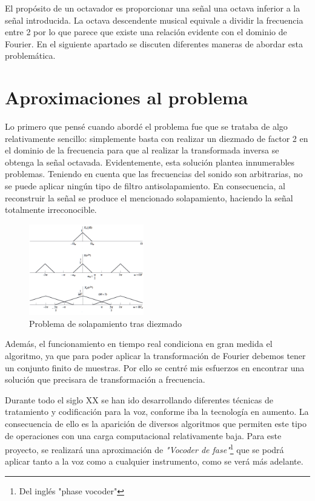 El propósito de un octavador es proporcionar una señal una octava inferior a la señal introducida. La octava descendente musical equivale a dividir la frecuencia entre 2 por lo que parece que existe una relación evidente con el dominio de Fourier. En el siguiente apartado se discuten diferentes maneras de abordar esta problemática.

\section{Aproximaciones al problema}
Lo primero que pensé cuando abordé el problema fue que se trataba de algo relativamente sencillo: simplemente basta con realizar un diezmado de factor 2 en el dominio de la frecuencia para que al realizar la transformada inversa se obtenga la señal octavada.
Evidentemente, esta solución plantea innumerables problemas. Teniendo en cuenta que las frecuencias del sonido son arbitrarias, no se puede aplicar ningún tipo de filtro antisolapamiento. En consecuencia, al reconstruir la señal se produce el mencionado solapamiento, haciendo la señal totalmente irreconocible.
\begin{figure}
\begin{center}
\includegraphics[width=5cm]{img/solapamiento.png}
\caption{Problema de solapamiento tras diezmado}
\end{center}
\end{figure}
Además, el funcionamiento en tiempo real condiciona en gran medida el algoritmo, ya que para poder aplicar la transformación de Fourier debemos tener un conjunto finito de muestras. Por ello se centré mis esfuerzos en encontrar una solución que precisara de transformación a frecuencia.

Durante todo el siglo XX se han ido desarrollando diferentes técnicas de tratamiento y codificación para la voz, conforme iba la tecnología en aumento. La consecuencia de ello es la aparición de diversos algoritmos que permiten este tipo de operaciones con una carga computacional relativamente baja. Para este proyecto, se realizará una aproximación de \emph{"Vocoder de fase"}\footnote{Del inglés "phase vocoder"} que se podrá aplicar tanto a la voz como a cualquier instrumento, como se verá más adelante.
